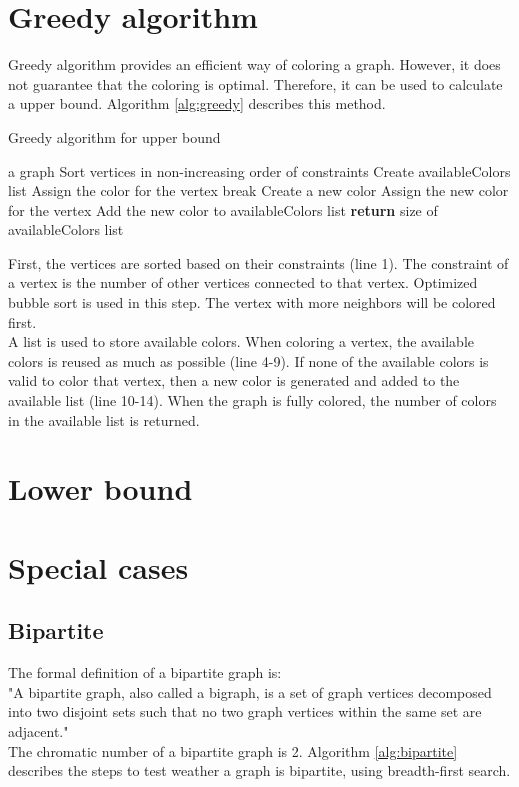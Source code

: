 \documentclass[a4paper]{report}
\begin{document}
		\section{Greedy algorithm}
		Greedy algorithm \cite{greedy} provides an efficient way of coloring a graph. However, it does not guarantee that the coloring is optimal. Therefore, it can be used to calculate a upper bound. Algorithm \ref{alg:greedy} describes this method.\\
		\begin{algorithm}
			\caption{Greedy algorithm for upper bound}
			\label{alg:greedy}
			\begin{algorithmic}[1]
				\REQUIRE a graph
				\STATE Sort vertices in non-increasing order of constraints
				\STATE Create availableColors list
					\STATE Assign the color for the vertex
					\STATE break
					\ENDIF
					\ENDFOR
					\STATE Create a new color
					\STATE Assign the new color for the vertex
					\STATE Add the new color to availableColors list
					\ENDIF
				\ENDFOR
				\STATE \textbf{return} size of availableColors list
			\end{algorithmic}
		\end{algorithm}
		First, the vertices are sorted based on their constraints (line 1). The constraint of a vertex is the number of other vertices connected to that vertex. Optimized bubble sort \cite{bubblesort2019} is used in this step. The vertex with more neighbors will be colored first.\\
		A list is used to store available colors. When coloring a vertex, the available colors is reused as much as possible (line 4-9). If none of the available colors is valid to color that vertex, then a new color is generated and added to the available list (line 10-14). When the graph is fully colored, the number of colors in the available list is returned.\\
		
		\section{Lower bound}
		
		\section{Special cases}
			\subsection{Bipartite}
			The formal definition of a bipartite graph is: \\
			"A bipartite graph, also called a bigraph, is a set of graph vertices decomposed into two disjoint sets such that no two graph vertices within the same set are adjacent." \cite{bipartiteDef} \\
			The chromatic number of a bipartite graph is 2. Algorithm \ref{alg:bipartite} \cite{bipartite} describes the steps to test weather a graph is bipartite, using breadth-first search. \\
			
\end{document}
